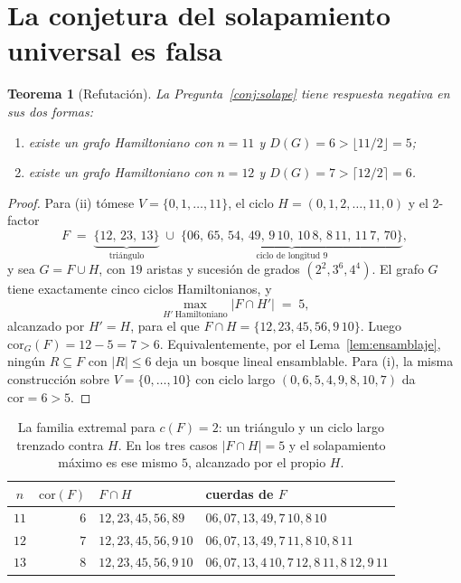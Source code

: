 \documentclass[11pt,a4paper]{article}
\newtheorem{teorema}{Teorema}[section]
\theoremstyle{definition}
\theoremstyle{remark}
\begin{document}
\section{La conjetura del solapamiento universal es falsa}\label{sec:refuta}

\begin{teorema}[Refutación]\label{thm:refuta}
La Pregunta~\ref{conj:solape} tiene respuesta negativa en sus dos formas:
\begin{enumerate}[label=(\roman*)]
\item existe un grafo Hamiltoniano con $n=11$ y $D(G)=6>\lfloor 11/2\rfloor=5$;
\item existe un grafo Hamiltoniano con $n=12$ y $D(G)=7>\lceil 12/2\rceil=6$.
\end{enumerate}
\end{teorema}

\begin{proof}
Para (ii) tómese $V=\{0,1,\dots,11\}$, el ciclo $H=(0,1,2,\dots,11,0)$ y el 2-factor
\[
F \;=\; \underbrace{\{12,\,23,\,13\}}_{\text{triángulo}}\;\cup\;\underbrace{\{06,\,65,\,54,\,49,\,9\,10,\,10\,8,\,8\,11,\,11\,7,\,70\}}_{\text{ciclo de longitud }9},
\]
y sea $G=F\cup H$, con $19$ aristas y sucesión de grados $(2^2,3^6,4^4)$. El grafo $G$ tiene exactamente cinco ciclos Hamiltonianos, y
\[
\max_{H'\ \text{Hamiltoniano}}|F\cap H'| \;=\; 5,
\]
alcanzado por $H'=H$, para el que $F\cap H=\{12,23,45,56,9\,10\}$. Luego $\mathrm{cor}_G(F)=12-5=7>6$. Equivalentemente, por el Lema~\ref{lem:ensamblaje}, ningún $R\subseteq F$ con $|R|\le6$ deja un bosque lineal ensamblable. Para (i), la misma construcción sobre $V=\{0,\dots,10\}$ con ciclo largo $(0,6,5,4,9,8,10,7)$ da $\mathrm{cor}=6>5$.
\end{proof}

\begin{table}[h]
\centering
\begin{tabular}{crll}
\toprule
$n$ & $\mathrm{cor}(F)$ & $F\cap H$ & cuerdas de $F$\\
\midrule
$11$ & $6$ & $12,23,45,56,89$ & $06,07,13,49,7\,10,8\,10$\\
$12$ & $7$ & $12,23,45,56,9\,10$ & $06,07,13,49,7\,11,8\,10,8\,11$\\
$13$ & $8$ & $12,23,45,56,9\,10$ & $06,07,13,4\,10,7\,12,8\,11,8\,12,9\,11$\\
\bottomrule
\end{tabular}
\caption{La familia extremal para $c(F)=2$: un triángulo y un ciclo largo trenzado contra $H$. En los tres casos $|F\cap H|=5$ y el solapamiento máximo es ese mismo $5$, alcanzado por el propio $H$.}\label{tab:familia}
\end{table}
\end{document}
